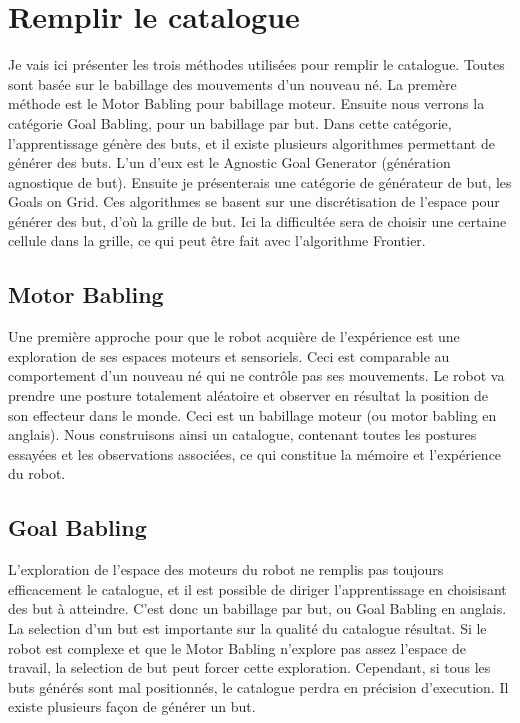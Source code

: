 \documentclass[11pt,french]{report}
\begin{document}
\section{Remplir le catalogue}

Je vais ici présenter les trois méthodes utilisées pour remplir le catalogue.
Toutes sont basée sur le babillage des mouvements d'un nouveau né.
La premère méthode est le Motor Babling pour babillage moteur.
Ensuite nous verrons la catégorie Goal Babling, pour un babillage par but.
Dans cette catégorie, l'apprentissage génère des buts, et il existe plusieurs algorithmes permettant de générer des buts.
L'un d'eux est le Agnostic Goal Generator (génération agnostique de but).
Ensuite je présenterais une catégorie de générateur de but, les Goals on Grid.
Ces algorithmes se basent sur une discrétisation de l'espace pour générer des but, d'où la grille de but.
Ici la difficultée sera de choisir une certaine cellule dans la grille, ce qui peut être fait avec l'algorithme Frontier.

\subsection{Motor Babling}

Une première approche pour que le robot acquière de l'expérience est une exploration de ses espaces moteurs et sensoriels.
Ceci est comparable au comportement d'un nouveau né qui ne contrôle pas ses mouvements.
Le robot va prendre une posture totalement aléatoire et observer en résultat la position de son effecteur dans le monde.
Ceci est un babillage moteur (ou motor babling en anglais).
Nous construisons ainsi un catalogue, contenant toutes les postures essayées et les observations associées, ce qui constitue la mémoire et l'expérience du robot.

\subsection{Goal Babling}

L'exploration de l'espace des moteurs du robot ne remplis pas toujours efficacement le catalogue, et il est possible de diriger l'apprentissage en choisisant des but à atteindre.
C'est donc un babillage par but, ou Goal Babling en anglais.
La selection d'un but est importante sur la qualité du catalogue résultat.
Si le robot est complexe et que le Motor Babling n'explore pas assez l'espace de travail, la selection de but peut forcer cette exploration.
Cependant, si tous les buts générés sont mal positionnés, le catalogue perdra en précision d'execution.
Il existe plusieurs façon de générer un but.
\end{document}
